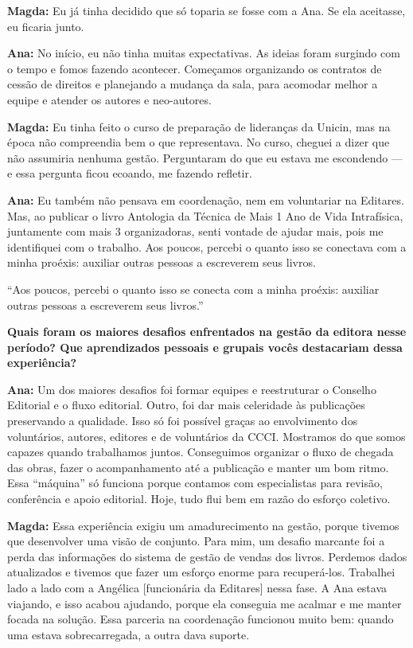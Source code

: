 \documentclass{gescons}
\begin{document}
\begin{multicols}{2}
\textbf{Magda:} Eu já tinha decidido que só toparia se fosse com a Ana. Se ela aceitasse, eu ficaria junto.

\textbf{Ana:} No início, eu não tinha muitas expectativas. As ideias foram surgindo com o tempo e fomos fazendo acontecer. Começamos organizando os contratos de cessão de direitos e planejando a mudança da sala, para acomodar melhor a equipe e atender os autores e neo-autores.

\textbf{Magda:} Eu tinha feito o curso de preparação de lideranças da Unicin, mas na época não compreendia bem o que representava. No curso, cheguei a dizer que não assumiria nenhuma gestão. Perguntaram do que eu estava me escondendo --- e essa pergunta ficou ecoando, me fazendo refletir.

\textbf{Ana:} Eu também não pensava em coordenação, nem em voluntariar na Editares. Mas, ao publicar o livro Antologia da Técnica de Mais 1 Ano de Vida Intrafísica, juntamente com mais 3 organizadoras, senti vontade de ajudar mais, pois me identifiquei com o trabalho. Aos poucos, percebi o quanto isso se conectava com a minha proéxis: auxiliar outras pessoas a escreverem seus livros.

\begin{pullquote}
``Aos poucos, percebi o quanto isso se conecta com a minha proéxis: auxiliar outras pessoas a escreverem seus livros.''
\end{pullquote}

\textbf{Quais foram os maiores desafios enfrentados na gestão da editora nesse período? Que aprendizados pessoais e grupais vocês destacariam dessa experiência?}

\textbf{Ana:} Um dos maiores desafios foi formar equipes e reestruturar o Conselho Editorial e o fluxo editorial. Outro, foi dar mais celeridade às publicações preservando a qualidade. Isso só foi possível graças ao envolvimento dos voluntários, autores, editores e de voluntários da CCCI. Mostramos do que somos capazes quando trabalhamos juntos. Conseguimos organizar o fluxo de chegada das obras, fazer o acompanhamento até a publicação e manter um bom ritmo. Essa “máquina” só funciona porque contamos com especialistas para revisão, conferência e apoio editorial. Hoje, tudo flui bem em razão do esforço coletivo.

\textbf{Magda:} Essa experiência exigiu um amadurecimento na gestão, porque tivemos que desenvolver uma visão de conjunto. Para mim, um desafio marcante foi a perda das informações  do sistema de gestão de vendas dos livros. Perdemos dados atualizados e tivemos que fazer um esforço enorme para recuperá-los. Trabalhei lado a lado com a Angélica {[funcionária da Editares]} nessa fase. A Ana estava viajando, e isso acabou ajudando, porque ela conseguia me acalmar e me manter focada na solução. Essa parceria na coordenação funcionou muito bem: quando uma estava sobrecarregada, a outra dava suporte.


\end{multicols}
\end{document}
